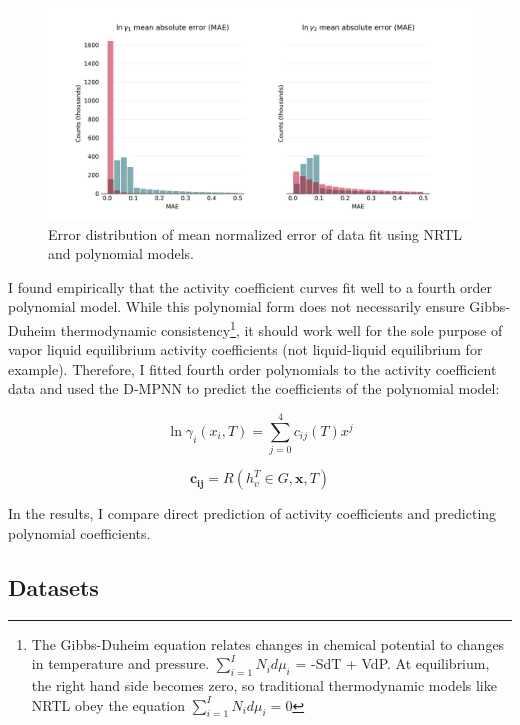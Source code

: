 \begin{figure}
    \centering
    \includegraphics[width=\textwidth]{gfx/Chapter07/error_distribution_fitting_cosmo.png}
    \caption{Error distribution of mean normalized error of data fit using NRTL and polynomial models.}
    \label{fig:mnae_distribution}
\end{figure}

I found empirically that the activity coefficient curves fit well to a fourth order polynomial model. While this  polynomial form does not necessarily ensure Gibbs-Duheim thermodynamic consistency\footnote{The Gibbs-Duheim equation relates changes in chemical potential to changes in temperature and pressure. $\sum_{i=1}^I N_i d\mu_i$ = -SdT + VdP. At equilibrium, the right hand side becomes zero, so traditional thermodynamic models like NRTL obey the equation $\sum_{i=1}^I N_i d\mu_i=0$}, it should work well for the sole purpose of vapor liquid equilibrium activity coefficients (not liquid-liquid equilibrium for example). Therefore, I fitted fourth order polynomials to the activity coefficient data and used the D-MPNN to predict the coefficients of the polynomial model:

\begin{equation}
    \ln \gamma_i(x_i,T) = \sum_{j=0}^4 c_{ij}(T)x^j
\end{equation}

\begin{equation}
     \mathbf{c_{ij}} = R(h_v^T \in G, \mathbf{x}, T)
\end{equation}

In the results, I compare direct prediction of activity coefficients and predicting polynomial coefficients.

\subsection{Datasets}

